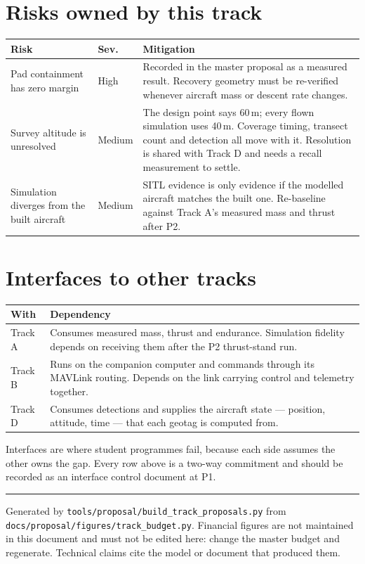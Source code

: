 \documentclass[11pt,a4paper]{article}
\begin{document}
\section{Risks owned by this track}

\begin{center}
\begin{tabular}{@{}p{50mm}lp{70mm}@{}}
\toprule
\textbf{Risk} & \textbf{Sev.} & \textbf{Mitigation} \\
\midrule
Pad containment has zero margin & High & Recorded in the master proposal as a measured result. Recovery geometry must be re-verified whenever aircraft mass or descent rate changes. \\
Survey altitude is unresolved & Medium & The design point says 60\,m; every flown simulation uses 40\,m. Coverage timing, transect count and detection all move with it. Resolution is shared with Track D and needs a recall measurement to settle. \\
Simulation diverges from the built aircraft & Medium & SITL evidence is only evidence if the modelled aircraft matches the built one. Re-baseline against Track A's measured mass and thrust after P2. \\
\bottomrule
\end{tabular}
\end{center}

\section{Interfaces to other tracks}

\begin{center}
\begin{tabular}{@{}lp{110mm}@{}}
\toprule
\textbf{With} & \textbf{Dependency} \\
\midrule
Track A & Consumes measured mass, thrust and endurance. Simulation fidelity depends on receiving them after the P2 thrust-stand run. \\
Track B & Runs on the companion computer and commands through its MAVLink routing. Depends on the link carrying control and telemetry together. \\
Track D & Consumes detections and supplies the aircraft state --- position, attitude, time --- that each geotag is computed from. \\
\bottomrule
\end{tabular}
\end{center}

Interfaces are where student programmes fail, because each side assumes the
other owns the gap. Every row above is a two-way commitment and should be
recorded as an interface control document at P1.


\vfill
\hrule\vspace{2mm}
{\small Generated by \texttt{tools/proposal/build\_track\_proposals.py} from
\texttt{docs/proposal/figures/track\_budget.py}. Financial figures are not
maintained in this document and must not be edited here: change the master
budget and regenerate. Technical claims cite the model or document that
produced them.}
\end{document}
